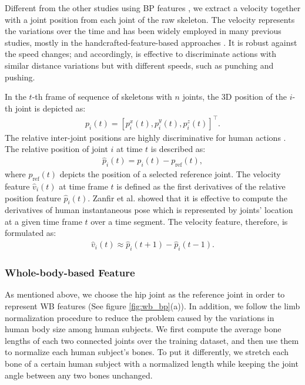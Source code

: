 \documentclass{bmvc2k}
\begin{document}
 Different from the other studies using BP features \cite{shahroudy2016ntu, liu2016spatio, ke2017skeletonnet}, we extract a velocity together with a joint position from each joint of the raw skeleton. The velocity represents the variations over the time and has been widely employed in many previous studies, mostly in the handcrafted-feature-based approaches \cite{zanfir2013moving, kerola2016graph, zhang2017geometric}. It is robust against the speed changes; and accordingly, is effective to discriminate actions with similar distance variations but with different speeds, such as punching and pushing.
 
 In the $t$-th frame of sequence of skeletons with $n$ joints, the 3D position of the $i$-th joint is depicted as:
 \begin{eqnarray}
 p_i(t)=[p_i^x(t), p_i^y(t), p_i^z(t)]^\top.
 \end{eqnarray}
 The relative inter-joint positions are highly discriminative for human actions \cite{luo2013group}. The relative position of joint $i$ at time $t$ is described as:
 \begin{eqnarray}
 \hat{p}_i(t)=p_i(t)-p_{\textrm{ref}}(t),
 \end{eqnarray}
 where $p_{\textrm{ref}}(t)$ depicts the position of a selected reference joint. The velocity feature $\hat{v}_i(t)$ at time frame $t$ is defined as the first derivatives of the relative position feature $\hat{p}_i(t)$. Zanfir et al.  \cite{zanfir2013moving} showed that it is effective to compute the derivatives of human instantaneous pose which is represented by joints' location at a given time frame $t$ over a time segment. The velocity feature, therefore, is formulated as:
 \begin{eqnarray}
 \hat{v}_i(t) \approx \hat{p}_i(t+1)-\hat{p}_i(t-1).
 \end{eqnarray}
 
\subsubsection{Whole-body-based Feature}

As mentioned above, we choose the hip joint as the reference joint in order to represent WB features (See figure \ref{fig:wb_bp}(a)). In addition, we follow the limb normalization procedure \cite{zanfir2013moving} to reduce the problem caused by the variations in human body size among human subjects. We first compute the average bone lengths of each two connected joints over the training dataset, and then use them to normalize each human subject's bones. To put it differently, we stretch each bone of a certain human subject with a normalized length while keeping the joint angle between any two bones unchanged.
\end{document}
